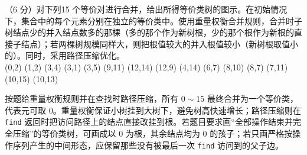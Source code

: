 \begin{question}
（6 分）对下列15 个等价对进行合并，给出所得等价类树的图示。在初始情况下，集合中的每个元素分别在独立的等价类中。使用重量权衡合并规则，合并时子树结点少的并入结点数多的那棵（多的那个作为新树根，少的那个根作为新根的直接子结点）；若两棵树规模同样大，则把根值较大的并入根值较小（新树根取值小的）。同时，采用路径压缩优化。\\
(0,2) (1,2) (3,4) (3,1) (3,5) (9,11) (12,14) (12,9) (4,14) (6,7) (8,10) (8,7) (7,11) (10,15) (10,13)
\begin{solution}
按题给重量权衡规则并在查找时路径压缩，所有 $0\sim15$ 最终合并为一个等价类，代表元可取 $0$。重量权衡保证小树挂到大树下，避免树高快速增长；路径压缩则在 \texttt{find} 返回时把访问路径上的结点直接改挂到根。若题目要求画“全部操作结束并完全压缩”的等价类树，可画成以 $0$ 为根，其余结点均为 $0$ 的孩子；若只画严格按操作序列产生的中间形态，应保留那些没有被最后一次 \texttt{find} 访问到的父子边。
\end{solution}
\end{question}


